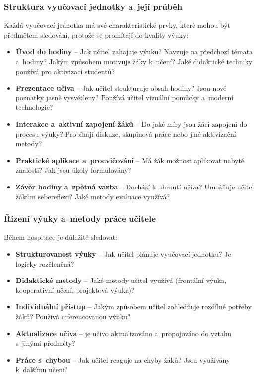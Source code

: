 \subsubsection{Struktura vyučovací jednotky a~její průběh}
Každá vyučovací jednotka má své charakteristické prvky, které mohou být předmětem sledování, protože se promítají do kvality výuky:
\begin{itemize}
    \item \textbf{Úvod do hodiny} – Jak učitel zahajuje výuku? Navzuje na předchozí témata a~hodiny? Jakým způsobem motivuje žáky k~učení? Jaké didaktické techniky používá pro aktivizaci studentů?
    \item \textbf{Prezentace učiva} – Jak učitel strukturuje obsah hodiny? Jsou nové poznatky jasně vysvětleny? Používá učitel vizuální pomůcky a~moderní technologie?
    \item \textbf{Interakce a~aktivní zapojení žáků} – Do jaké míry jsou žáci zapojeni do procesu výuky? Probíhají diskuze, skupinová práce nebo jiné aktivizační metody?
    \item \textbf{Praktické aplikace a~procvičování} – Má žák možnost aplikovat nabyté znalosti? Jak jsou úkoly formulovány?
    \item \textbf{Závěr hodiny a~zpětná vazba} – Dochází k~shrnutí učiva? Umožňuje učitel žákům sebereflexi? Jaké metody evaluace využívá?
\end{itemize}

\subsubsection{Řízení výuky a~metody práce učitele}
Během hospitace je důležité sledovat:
\begin{itemize}
    \item \textbf{Strukturovanost výuky} – Jak učitel plánuje vyučovací jednotku? Je logicky rozčleněná?
    \item \textbf{Didaktické metody} – Jaké metody učitel využívá (frontální výuka, kooperativní učení, projektová výuka)?
    \item \textbf{Individuální přístup} – Jakým způsobem učitel zohledňuje rozdílné potřeby žáků? Používá diferencovanou výuku?
    \item \textbf{Aktualizace učiva} – je učivo aktualizováno a~propojováno do vztahu s~jinými předměty?
    \item \textbf{Práce s~chybou} – Jak učitel reaguje na chyby žáků? Jsou využívány k~dalšímu učení?
\end{itemize}

